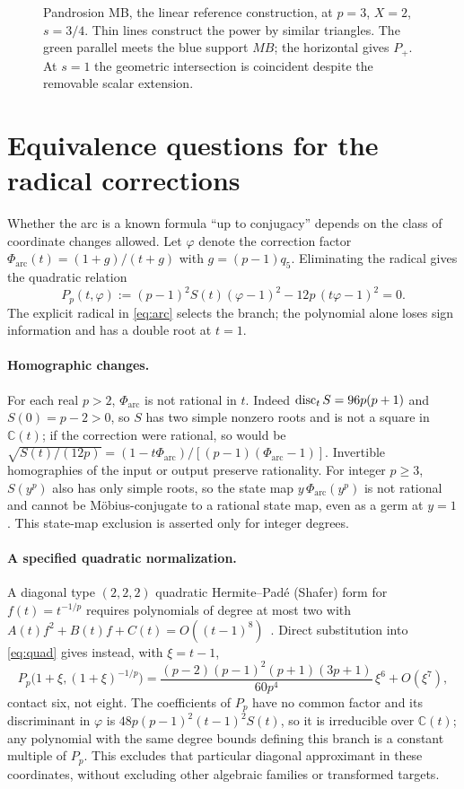 \begin{figure}[h]
\centering\figMB
\caption{Pandrosion MB, the linear reference construction, at $p=3$, $X=2$, $s=3/4$. Thin lines
construct the power by similar triangles. The green parallel meets the blue support $MB$; the
horizontal gives $P_+$. At $s=1$ the geometric intersection is coincident despite the removable scalar
extension.}\label{fig:mb}
\end{figure}

\FloatBarrier
\section{Equivalence questions for the radical corrections}\label{app:equiv}

Whether the arc is a known formula ``up to conjugacy'' depends on the class of coordinate changes
allowed. Let $\varphi$ denote the correction factor $\Phi_{\mathrm{arc}}(t)=(1+g)/(t+g)$ with
$g=(p-1)q_5$. Eliminating the radical gives the quadratic relation
\begin{equation}\label{eq:quad}
P_p(t,\varphi):=(p-1)^{2}S(t)(\varphi-1)^{2}-12p\,(t\varphi-1)^{2}=0 .
\end{equation}
The explicit radical in \eqref{eq:arc} selects the branch; the polynomial alone loses sign information
and has a double root at $t=1$.

\paragraph{Homographic changes.}
For each real $p>2$, $\Phi_{\mathrm{arc}}$ is not rational in $t$. Indeed $\operatorname{disc}_tS=96p(p+1)$ and
$S(0)=p-2>0$, so $S$ has two simple nonzero roots and is not a square in $\mathbb{C}(t)$; if the
correction were rational, so would be
$\sqrt{S(t)/(12p)}=(1-t\Phi_{\mathrm{arc}})/[(p-1)(\Phi_{\mathrm{arc}}-1)]$. Invertible homographies of
the input or output preserve rationality. For integer $p\ge3$, $S(y^{p})$ also has only simple roots,
so the state map $y\,\Phi_{\mathrm{arc}}(y^{p})$ is not rational and cannot be M\"obius-conjugate to a
rational state map, even as a germ at $y=1$. This state-map exclusion is asserted only for integer
degrees.

\paragraph{A specified quadratic normalization.}
A diagonal type $(2,2,2)$ quadratic Hermite--Pad\'e (Shafer) form for $f(t)=t^{-1/p}$ requires
polynomials of degree at most two with $A(t)f^{2}+B(t)f+C(t)=O((t-1)^{8})$~\cite[eqs.~(1.4)--(1.6)]{cabay}.
Direct substitution into \eqref{eq:quad} gives instead, with $\xi=t-1$,
\[ P_p\bigl(1+\xi,(1+\xi)^{-1/p}\bigr)=\frac{(p-2)(p-1)^{2}(p+1)(3p+1)}{60p^{4}}\,\xi^{6}+O(\xi^{7}), \]
contact six, not eight. The coefficients of $P_p$ have no common factor and its discriminant in
$\varphi$ is $48p(p-1)^{2}(t-1)^{2}S(t)$, so it is irreducible over $\mathbb{C}(t)$; any polynomial
with the same degree bounds defining this branch is a constant multiple of $P_p$. This excludes that
particular diagonal approximant in these coordinates, without excluding other algebraic families or
transformed targets.

